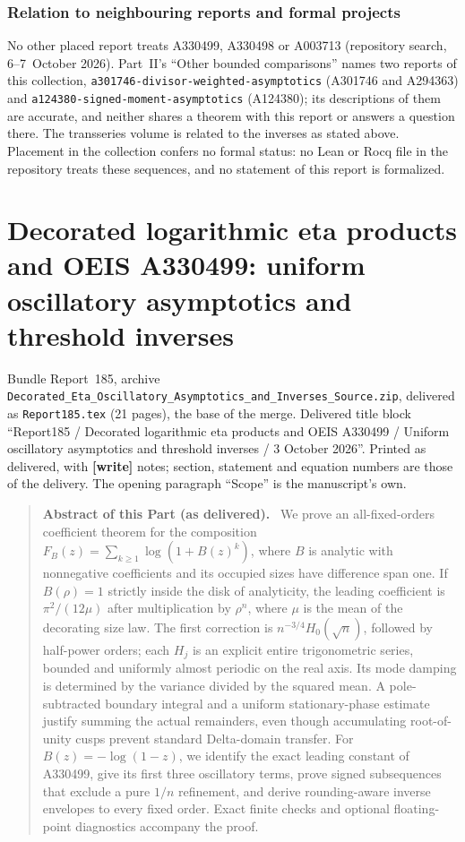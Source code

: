 \documentclass[11pt]{article}
\theoremstyle{definition}\newtheorem{definition}[theorem]{Definition}
\theoremstyle{remark}\newtheorem{remark}[theorem]{Remark}
\newcommand{\file}[1]{\nolinkurl{#1}}
\newenvironment{partabstract}{\begin{quote}\small\noindent\textbf{Abstract of this Part (as delivered).}\ }{\end{quote}}
\newcommand{\partsource}[1]{\par\noindent\begin{minipage}{\textwidth}\small #1\end{minipage}\par\medskip}
\begin{document}
\section*{Relation to neighbouring reports and formal projects}\label{dep:sec:neighbours}
No other placed report treats A330499, A330498 or A003713 (repository search,
6--7~October 2026). Part~II's ``Other bounded comparisons'' names two reports
of this collection, \file{a301746-divisor-weighted-asymptotics} (A301746 and
A294363) and \file{a124380-signed-moment-asymptotics} (A124380); its
descriptions of them are accurate, and neither shares a theorem with this
report or answers a question there. The transseries volume \cite{tsvol} is
related to the inverses as stated above. Placement in the collection confers
no formal status: no Lean or Rocq file in the repository treats these
sequences, and no statement of this report is formalized.
\clearpage

\part{Decorated logarithmic eta products and OEIS A330499: uniform oscillatory asymptotics and threshold inverses}\label{dep:eta:part}
\partsource{Bundle Report~185, archive \file{Decorated_Eta_Oscillatory_Asymptotics_and_Inverses_Source.zip}, delivered as \file{Report185.tex} (21 pages), the base of the merge. Delivered title block ``Report185 / Decorated logarithmic eta products and OEIS A330499 / Uniform oscillatory asymptotics and threshold inverses / 3 October 2026''. Printed as delivered, with \textbf{[write]} notes; section, statement and equation numbers are those of the delivery. The opening paragraph ``Scope'' is the manuscript's own.}
\begin{partabstract}
We prove an all-fixed-orders coefficient theorem for the composition
$F_B(z)=\sum_{k\ge1}\log(1+B(z)^k)$, where $B$ is analytic with nonnegative
coefficients and its occupied sizes have difference span one. If
$B(\rho)=1$ strictly inside the disk of analyticity, the leading coefficient
is $\pi^2/(12\mu)$ after multiplication by $\rho^n$, where $\mu$ is the
mean of the decorating size law. The first correction is
$n^{-3/4}H_0(\sqrt n)$, followed by half-power orders; each $H_j$ is an
explicit entire trigonometric series, bounded and uniformly almost periodic
on the real axis. Its mode damping is determined by the variance divided
by the squared mean. A pole-subtracted boundary integral and a uniform
stationary-phase estimate justify summing the actual remainders, even
though accumulating root-of-unity cusps prevent standard Delta-domain
transfer. For $B(z)=-\log(1-z)$, we identify the exact leading constant
of A330499, give its first three oscillatory terms, prove signed
subsequences that exclude a pure $1/n$ refinement, and derive
rounding-aware inverse envelopes to every fixed order. Exact finite
checks and optional floating-point diagnostics accompany the proof.
\end{partabstract}
\end{document}
